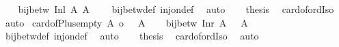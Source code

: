 \begin{isabellebody}
%
\isadelimproof
%
\endisadelimproof
%
\isatagproof
{}\isamarkupfalse%
{\isacharminus}{\kern0pt}\isanewline
\ \ \isamarkupfalse%
\ {\isachardoublequoteopen}bij{\isacharunderscore}{\kern0pt}betw\ Inl\ A\ {\isacharparenleft}{\kern0pt}A\ {\isacharless}{\kern0pt}{\isacharplus}{\kern0pt}{\isachargreater}{\kern0pt}\ {\isacharbraceleft}{\kern0pt}{\isacharbraceright}{\kern0pt}{\isacharparenright}{\kern0pt}{\isachardoublequoteclose}\ \isamarkupfalse%
\ bij{\isacharunderscore}{\kern0pt}betw{\isacharunderscore}{\kern0pt}def\ inj{\isacharunderscore}{\kern0pt}on{\isacharunderscore}{\kern0pt}def\ \isamarkupfalse%
\ auto\isanewline
\ \ \isamarkupfalse%
\ {\isacharquery}{\kern0pt}thesis\ \isamarkupfalse%
\ card{\isacharunderscore}{\kern0pt}of{\isacharunderscore}{\kern0pt}ordIso\ \isamarkupfalse%
\ auto\isanewline
{}\isamarkupfalse%
%
\endisatagproof
{\isafoldproof}%
%
\isadelimproof
\isanewline
%
\endisadelimproof
\isanewline
{}\isamarkupfalse%
\ card{\isacharunderscore}{\kern0pt}of{\isacharunderscore}{\kern0pt}Plus{\isacharunderscore}{\kern0pt}empty{}{\isacharcolon}{\kern0pt}\ {\isachardoublequoteopen}{\isacharbar}{\kern0pt}A{\isacharbar}{\kern0pt}\ {\isacharequal}{\kern0pt}o\ {\isacharbar}{\kern0pt}{\isacharbraceleft}{\kern0pt}{\isacharbraceright}{\kern0pt}\ {\isacharless}{\kern0pt}{\isacharplus}{\kern0pt}{\isachargreater}{\kern0pt}\ A{\isacharbar}{\kern0pt}{\isachardoublequoteclose}\isanewline
%
\isadelimproof
%
\endisadelimproof
%
\isatagproof
{}\isamarkupfalse%
{\isacharminus}{\kern0pt}\isanewline
\ \ \isamarkupfalse%
\ {\isachardoublequoteopen}bij{\isacharunderscore}{\kern0pt}betw\ Inr\ A\ {\isacharparenleft}{\kern0pt}{\isacharbraceleft}{\kern0pt}{\isacharbraceright}{\kern0pt}\ {\isacharless}{\kern0pt}{\isacharplus}{\kern0pt}{\isachargreater}{\kern0pt}\ A{\isacharparenright}{\kern0pt}{\isachardoublequoteclose}\ \isamarkupfalse%
\ bij{\isacharunderscore}{\kern0pt}betw{\isacharunderscore}{\kern0pt}def\ inj{\isacharunderscore}{\kern0pt}on{\isacharunderscore}{\kern0pt}def\ \isamarkupfalse%
\ auto\isanewline
\ \ \isamarkupfalse%
\ {\isacharquery}{\kern0pt}thesis\ \isamarkupfalse%
\ card{\isacharunderscore}{\kern0pt}of{\isacharunderscore}{\kern0pt}ordIso\ \isamarkupfalse%
\ auto\isanewline
{}\isamarkupfalse%
%
\endisatagproof
{\isafoldproof}%
%
\isadelimproof
\isanewline
%
\endisadelimproof

\end{isabellebody}
